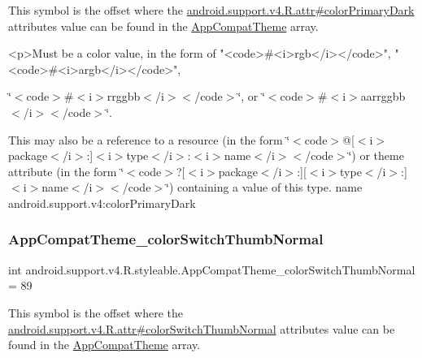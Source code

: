 This symbol is the offset where the \hyperlink{classandroid_1_1support_1_1v4_1_1R_1_1attr_a6fc63ddfec27d2e1ddf500bd17b1d8b5}{android.\+support.\+v4.\+R.\+attr\#color\+Primary\+Dark} attribute\textquotesingle{}s value can be found in the \hyperlink{classandroid_1_1support_1_1v4_1_1R_1_1styleable_ac07ebbe62ed977f6dcaadc6397840ace}{App\+Compat\+Theme} array.

\begin{DoxyVerb}      <p>Must be a color value, in the form of "<code>#<i>rgb</i></code>", "<code>#<i>argb</i></code>",
\end{DoxyVerb}
 \char`\"{}$<$code$>$\#$<$i$>$rrggbb$<$/i$>$$<$/code$>$\char`\"{}, or \char`\"{}$<$code$>$\#$<$i$>$aarrggbb$<$/i$>$$<$/code$>$\char`\"{}. 

This may also be a reference to a resource (in the form \char`\"{}$<$code$>$@\mbox{[}$<$i$>$package$<$/i$>$\+:\mbox{]}$<$i$>$type$<$/i$>$\+:$<$i$>$name$<$/i$>$$<$/code$>$\char`\"{}) or theme attribute (in the form \char`\"{}$<$code$>$?\mbox{[}$<$i$>$package$<$/i$>$\+:\mbox{]}\mbox{[}$<$i$>$type$<$/i$>$\+:\mbox{]}$<$i$>$name$<$/i$>$$<$/code$>$\char`\"{}) containing a value of this type.  name android.\+support.\+v4\+:color\+Primary\+Dark \mbox{\label{classandroid_1_1support_1_1v4_1_1R_1_1styleable_ae369a455853f8d39ed5e796399c80ca1}} 
\subsubsection{\texorpdfstring{App\+Compat\+Theme\+\_\+color\+Switch\+Thumb\+Normal}{AppCompatTheme\_colorSwitchThumbNormal}}
{\footnotesize\ttfamily int android.\+support.\+v4.\+R.\+styleable.\+App\+Compat\+Theme\+\_\+color\+Switch\+Thumb\+Normal = 89\hspace{0.3cm}{\ttfamily [static]}}

This symbol is the offset where the \hyperlink{classandroid_1_1support_1_1v4_1_1R_1_1attr_a6028fce7673c59e3b4d6dec1bc997df8}{android.\+support.\+v4.\+R.\+attr\#color\+Switch\+Thumb\+Normal} attribute\textquotesingle{}s value can be found in the \hyperlink{classandroid_1_1support_1_1v4_1_1R_1_1styleable_ac07ebbe62ed977f6dcaadc6397840ace}{App\+Compat\+Theme} array.

